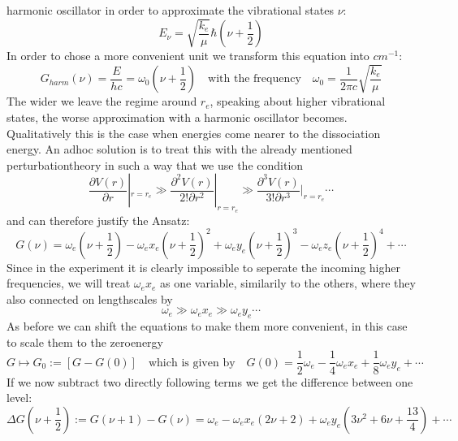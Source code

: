 harmonic oscillator in order to approximate
the vibrational states $\nu$:
\begin{equation}
    E_\nu =\sqrt{\frac{k_e}{\mu}}\hbar \left (\nu
        + \frac{1}{2}\right )
\end{equation}
In order to chose a more convenient unit we transform this
equation into $cm^{-1}$:
\begin{equation}
    G_{harm}(\nu) = \frac{E}{hc} = \omega_0 (\nu + \frac{1}{2})
    \quad \text{with the frequency} \quad
    \omega_0 = \frac{1}{2\pi c} \sqrt{\frac{k_e}{\mu}}
\end{equation}
The wider we leave the regime around $r_e$, speaking about 
higher vibrational states, the worse approximation with a harmonic
oscillator becomes. Qualitatively this is the case when energies
come nearer to the dissociation energy. An adhoc solution is 
to treat this with the already mentioned perturbationtheory in such
a way that we use the condition
\begin{equation}
    \frac{\partial V(r)}{\partial r}|_{r=r_e}        \gg
    \frac{\partial^2 V(r)}{2!\partial r^2}|_{r=r_e}  \gg
    \frac{\partial^3 V(r)}{3!\partial r^3}|_{r=r_e}  
    \cdots
\end{equation}
and can therefore justify the Ansatz:
\begin{equation}
    G(\nu) = \omega_e (\nu + \frac{1}{2} ) 
    - \omega_e x_e (\nu + \frac{1}{2} ) ^2 
    + \omega_e y_e (\nu + \frac{1}{2} ) ^3 
    - \omega_e z_e (\nu + \frac{1}{2} ) ^4 
    + \cdots 
    \label{eqn:G(v)_taylor}
\end{equation}
Since in the experiment it is clearly impossible to seperate
the incoming higher frequencies, we will treat $\omega_e x_e$ as 
one variable, similarily to the others, where they also connected
on lengthscales by
\begin{equation}
    \omega_e \gg \omega_ex_e \gg \omega_e y_e \cdots 
\end{equation}
As before we can shift the equations to make them more convenient,
in this case to scale them to the zeroenergy
\begin{equation}
    G \mapsto G_0 := \left [G-G(0) \right ] 
        \quad \text{which is given by}
    \quad G(0)=\frac{1}{2}\omega_e - \frac{1}{4}\omega_e x_e 
    + \frac{1}{8} \omega_e y_e + \cdots 
\end{equation}
If we now subtract two directly following terms we get the 
difference between one level:
\begin{equation}
    \Delta G(\nu +\frac{1}{2}) := G(\nu +1 ) - G(\nu) 
    = \omega_e - \omega_e x_e \left (2\nu +2\right ) + \omega_e y_e 
    \left (3\nu^2+ 6\nu + \frac{13}{4} 
        \right) + \cdots 
\end{equation} 
